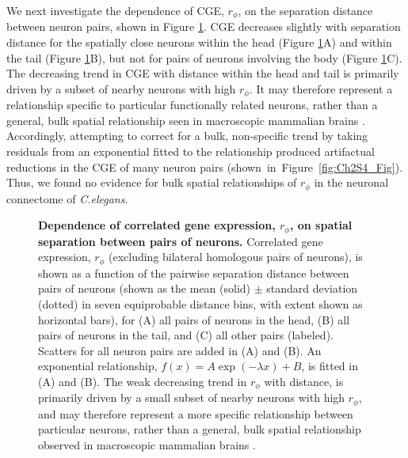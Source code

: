 We next investigate the dependence of CGE, $r_\phi$, on the separation distance between neuron pairs, shown in Figure \ref{fig:Ch2Fig4}.
CGE decreases slightly with separation distance for the spatially close neurons within the head (Figure \ref{fig:Ch2Fig4}A) and within the tail (Figure \ref{fig:Ch2Fig4}B), but not for pairs of neurons involving the body (Figure \ref{fig:Ch2Fig4}C).
The decreasing trend in CGE with distance within the head and tail is primarily driven by a subset of nearby neurons with high $r_\phi$.
It may therefore represent a relationship specific to particular functionally related neurons, rather than a general, bulk spatial relationship seen in macroscopic mammalian brains \citep{Fulcher2016}.
Accordingly, attempting to correct for a bulk, non-specific trend by taking residuals from an exponential fitted to the relationship produced artifactual reductions in the CGE of many neuron pairs \mbox{(shown in Figure \ref{fig:Ch2S4_Fig})}.
Thus, we found no evidence for bulk spatial relationships of $r_\phi$ in the neuronal connectome of \emph{C.elegans}.

\begin{figure}[h]
  \caption{
  \textbf{Dependence of correlated gene expression, $r_\phi$, on spatial separation between pairs of neurons.}
  Correlated gene expression, $r_\phi$ (excluding bilateral homologous pairs of neurons), is shown as a function of the pairwise separation distance between pairs of neurons (shown as the mean (solid) $\pm$ standard deviation (dotted) in seven equiprobable distance bins, with extent shown as horizontal bars), for (A) all pairs of neurons in the head, (B) all pairs of neurons in the tail, and (C) all other pairs (labeled).
  Scatters for all neuron pairs are added in (A) and (B).
  An exponential relationship, $f(x) = A\exp(-\lambda x) + B$, is fitted in (A) and (B).
  The weak decreasing trend in $r_\phi$ with distance, is primarily driven by a small subset of nearby neurons with high $r_\phi$, and may therefore represent a more specific relationship between particular neurons, rather than a general, bulk spatial relationship observed in macroscopic mammalian brains \citep{Fulcher2016, Krienen2016}.}
\label{fig:Ch2Fig4}
\end{figure}

